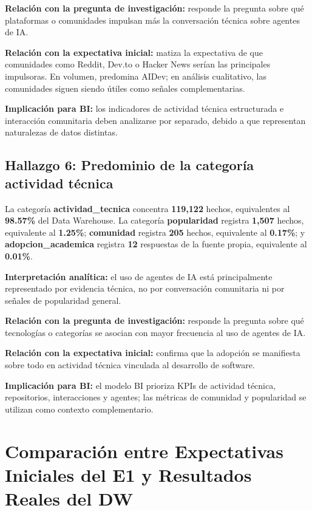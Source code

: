 \documentclass[12pt,a4paper]{article}
\begin{document}
\textbf{Relaci\'on con la pregunta de investigaci\'on:} responde la pregunta sobre qu\'e plataformas o comunidades impulsan m\'as la conversaci\'on t\'ecnica sobre agentes de IA.

\textbf{Relaci\'on con la expectativa inicial:} matiza la expectativa de que comunidades como Reddit, Dev.to o Hacker News ser\'ian las principales impulsoras. En volumen, predomina AIDev; en an\'alisis cualitativo, las comunidades siguen siendo \'utiles como se\~nales complementarias.

\textbf{Implicaci\'on para BI:} los indicadores de actividad t\'ecnica estructurada e interacci\'on comunitaria deben analizarse por separado, debido a que representan naturalezas de datos distintas.

\subsection*{Hallazgo 6: Predominio de la categor\'ia actividad t\'ecnica}

La categor\'ia \textbf{actividad\_tecnica} concentra \textbf{119,122} hechos, equivalentes al \textbf{98.57\%} del Data Warehouse. La categor\'ia \textbf{popularidad} registra \textbf{1,507} hechos, equivalente al \textbf{1.25\%}; \textbf{comunidad} registra \textbf{205} hechos, equivalente al \textbf{0.17\%}; y \textbf{adopcion\_academica} registra \textbf{12} respuestas de la fuente propia, equivalente al \textbf{0.01\%}.

\textbf{Interpretaci\'on anal\'itica:} el uso de agentes de IA est\'a principalmente representado por evidencia t\'ecnica, no por conversaci\'on comunitaria ni por se\~nales de popularidad general.

\textbf{Relaci\'on con la pregunta de investigaci\'on:} responde la pregunta sobre qu\'e tecnolog\'ias o categor\'ias se asocian con mayor frecuencia al uso de agentes de IA.

\textbf{Relaci\'on con la expectativa inicial:} confirma que la adopci\'on se manifiesta sobre todo en actividad t\'ecnica vinculada al desarrollo de software.

\textbf{Implicaci\'on para BI:} el modelo BI prioriza KPIs de actividad t\'ecnica, repositorios, interacciones y agentes; las m\'etricas de comunidad y popularidad se utilizan como contexto complementario.

\section{Comparaci\'on entre Expectativas Iniciales del E1 y Resultados Reales del DW}
\end{document}
